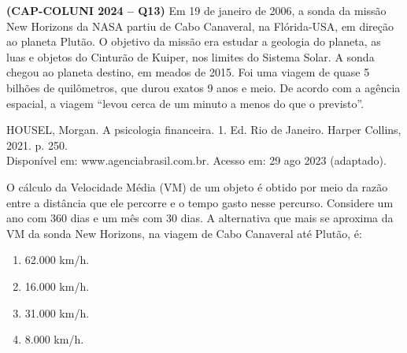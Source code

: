 \textbf{(CAP-COLUNI 2024 -- Q13)} Em 19 de janeiro de 2006, a sonda da missão New Horizons da NASA partiu de Cabo Canaveral, na Flórida-USA, em direção ao planeta Plutão. O objetivo da missão era estudar a geologia do planeta, as luas e objetos do Cinturão de Kuiper, nos limites do Sistema Solar. A sonda chegou ao planeta destino, em meados de 2015. Foi uma viagem de quase 5 bilhões de quilômetros, que durou exatos 9 anos e meio. De acordo com a agência espacial, a viagem ``levou cerca de um minuto a menos do que o previsto''.

HOUSEL, Morgan. A psicologia financeira. 1. Ed. Rio de Janeiro. Harper Collins, 2021. p. 250.\\
Disponível em: www.agenciabrasil.com.br. Acesso em: 29 ago 2023 (adaptado).

O cálculo da Velocidade Média (VM) de um objeto é obtido por meio da razão entre a distância que ele percorre e o tempo gasto nesse percurso. Considere um ano com 360 dias e um mês com 30 dias. A alternativa que mais se aproxima da VM da sonda New Horizons, na viagem de Cabo Canaveral até Plutão, é:

\begin{enumerate}
	\item 62.000 km/h.
	\item 16.000 km/h.
	\item 31.000 km/h.
	\item 8.000 km/h.
\end{enumerate}
